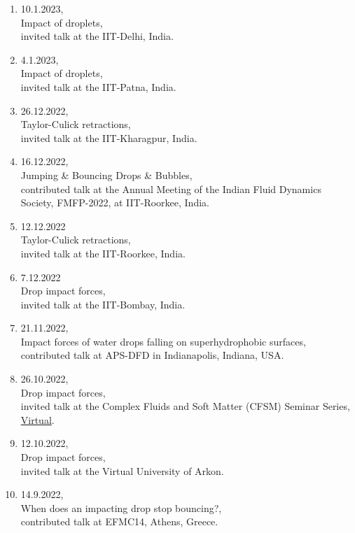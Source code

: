 \documentclass[11pt,a4paper,roman,english,colorlinks,linkcolor={red!50!black}]{moderncv}
\begin{document}
\begin{enumerate}[leftmargin=0.75cm]
	\item 10.1.2023,\\
	Impact of droplets,\\
	invited talk at the IIT-Delhi, India.

	\item 4.1.2023,\\
	Impact of droplets,\\
	invited talk at the IIT-Patna, India.

	\item 26.12.2022,\\
	Taylor-Culick retractions,\\
	invited talk at the IIT-Kharagpur, India.

	\item 16.12.2022,\\
	Jumping \& Bouncing Drops \& Bubbles,\\
	contributed talk at the Annual Meeting of the Indian Fluid Dynamics Society, FMFP-2022, at IIT-Roorkee, India.

	\item 12.12.2022\\
	Taylor-Culick retractions,\\
	invited talk at the IIT-Roorkee, India.

	\item 7.12.2022\\
	Drop impact forces,\\
	invited talk at the IIT-Bombay, India.

	\item 21.11.2022,\\
	Impact forces of water drops falling on superhydrophobic surfaces,\\
	contributed talk at APS-DFD in Indianapolis, Indiana, USA.

	\item 26.10.2022,\\
	Drop impact forces,\\
	invited talk at the Complex Fluids and Soft Matter (CFSM) Seminar Series, \href{https://youtu.be/enTMAucwUDs}{Virtual}.

	\item 12.10.2022,\\
	Drop impact forces,\\
	invited talk at the Virtual University of Arkon.

	\item 14.9.2022,\\
	When does an impacting drop stop bouncing?,\\
	contributed talk at EFMC14, Athens, Greece.


\end{enumerate}
\end{document}
